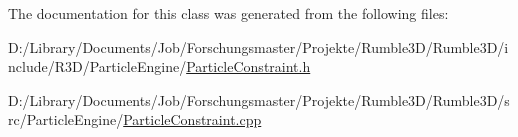The documentation for this class was generated from the following files\+:\begin{DoxyCompactItemize}
\item 
D\+:/\+Library/\+Documents/\+Job/\+Forschungsmaster/\+Projekte/\+Rumble3\+D/\+Rumble3\+D/include/\+R3\+D/\+Particle\+Engine/\mbox{\hyperlink{_particle_constraint_8h}{Particle\+Constraint.\+h}}\item 
D\+:/\+Library/\+Documents/\+Job/\+Forschungsmaster/\+Projekte/\+Rumble3\+D/\+Rumble3\+D/src/\+Particle\+Engine/\mbox{\hyperlink{_particle_constraint_8cpp}{Particle\+Constraint.\+cpp}}\end{DoxyCompactItemize}

